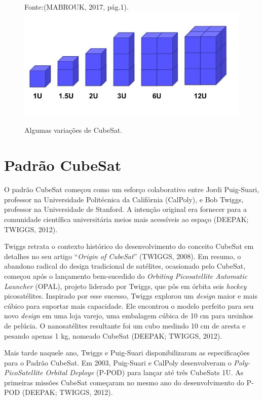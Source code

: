 {\small
	\begin{figure}[h]
		\centering
		Fonte:(MABROUK, 2017, pág.1).
		\includegraphics[keepaspectratio=true,scale=0.58]{figuras/cubesatVariacoes.PNG}
		\caption{Algumas variações de CubeSat.}
		\label{fig04}
	\end{figure}
}

\section{Padrão CubeSat}

O padrão CubeSat começou como um esforço colaborativo entre Jordi Puig-Suari, professor na Universidade Politécnica da Califórnia (CalPoly), e Bob Twiggs, professor na Universidade de Stanford. A intenção original era fornecer para a comunidade científica universitária meios mais acessíveis ao espaço (DEEPAK; TWIGGS, 2012).

Twiggs retrata o contexto histórico do desenvolvimento do conceito CubeSat em detalhes no seu artigo “\textit{Origin of CubeSat}” (TWIGGS, 2008). Em resumo, o abandono radical do design tradicional de satélites, ocasionado pelo CubeSat, começou após o lançamento bem-sucedido do \textit{Orbiting Picosatellite Automatic Launcher} (OPAL), projeto liderado por Twiggs, que pôs em órbita seis \textit{hockey} picosatélites. Inspirado por esse sucesso, Twiggs explorou um \textit{design} maior e mais cúbico para suportar mais capacidade. Ele encontrou o modelo perfeito para seu novo \textit{design} em uma loja varejo, uma embalagem cúbica de 10 cm para ursinhos de pelúcia. O nanosatélites resultante foi um cubo medindo 10 cm de aresta e pesando apenas 1 kg, nomeado CubeSat (DEEPAK; TWIGGS, 2012).

Mais tarde naquele ano, Twiggs e Puig-Suari disponibilizaram as especificações para o Padrão CubeSat. Em 2003, Puig-Suari e CalPoly desenvolveram o \textit{Poly-PicoSatellite Orbital Deploye} (P-POD) para lançar até três CubeSats 1U. As primeiras missões CubeSat começaram no  mesmo ano do desenvolvimento do P-POD (DEEPAK; TWIGGS, 2012).


